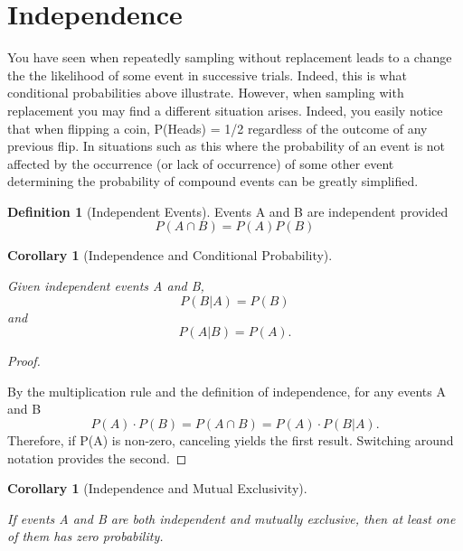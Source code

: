 \documentclass[10pt,]{book}
\theoremstyle{plain}
\newtheorem{corollary}[theorem]{Corollary}
\theoremstyle{definition}
\newtheorem{definition}[theorem]{Definition}
\theoremstyle{definition}
\theoremstyle{definition}
\numberwithin{equation}{section}
\begin{document}
\section[Independence]{Independence}\label{section-21}
\typeout{************************************************}
\typeout{************************************************}

		You have seen when repeatedly sampling without replacement leads to a change the the likelihood of some event in successive trials. Indeed, this is what conditional probabilities above illustrate. However, when sampling with replacement you may find a different situation arises. Indeed, you easily notice that when flipping a coin, P(Heads) = 1/2 regardless of the outcome of any previous flip.  In situations such as this where the probability of an event is not affected by the occurrence (or lack of occurrence) of some other event determining the probability of compound events can be greatly simplified.
\begin{definition}[Independent Events]\label{definition-24}
Events A and B are independent provided 
		\begin{equation*}P(A \cap B) = P(A) P(B)\end{equation*}\end{definition}
\begin{corollary}[Independence and Conditional Probability]\label{corollary-3}

			Given independent events A and B, 
			\begin{equation*}P(B | A) = P(B)\end{equation*} and \begin{equation*}P(A | B) = P(A).\end{equation*}\end{corollary}
\begin{proof}\hypertarget{proof-21}{}
By the multiplication rule and the definition of independence, for any events A and B
			\begin{equation*}P(A) \cdot P(B) = P(A \cap B) = P(A) \cdot P(B | A) .\end{equation*}
			Therefore, if P(A) is non-zero, canceling yields the first result. Switching around notation provides the second.
\end{proof}
\begin{corollary}[Independence and Mutual Exclusivity]\label{corollary-4}

			If events A and B are both independent and mutually exclusive, then at least one of them has zero probability.
		\end{corollary}
\end{document}
